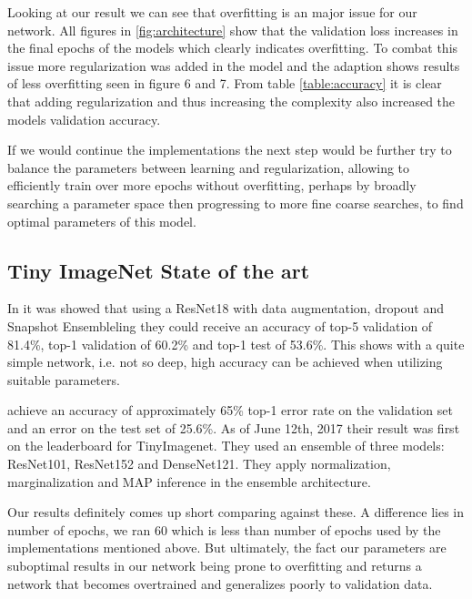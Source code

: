 \documentclass{kthreport}
\begin{document}
Looking at our result we can see that overfitting is an major issue for our network.
All figures in \ref{fig:architecture} show that the validation loss increases in the final epochs of the models which clearly indicates overfitting.
To combat this issue more regularization was added in the model and the adaption shows results of less overfitting seen in figure 6 and 7.
From table \ref{table:accuracy} it is clear that adding regularization and thus increasing the complexity also increased the models validation accuracy.

If we would continue the implementations the next step would be further try to balance the parameters between learning and regularization, allowing to efficiently train over more epochs without overfitting, perhaps by broadly searching a parameter space then progressing to more fine coarse searches, to find optimal parameters of this model.


\subsection{Tiny ImageNet State of the art}

In \cite{BarnesStanford} it was showed that using a ResNet18 with data augmentation, dropout and Snapshot Ensembleling they could receive an accuracy of top-5 validation of 81.4\%, top-1 validation of 60.2\% and top-1 test of 53.6\%. This shows with a quite simple network, i.e. not so deep, high accuracy can be achieved when utilizing suitable parameters.

\cite{vCheung} achieve an accuracy of approximately 65\% top-1 error rate on the validation set and an error on the test set of 25.6\%. As of June 12th, 2017 their result was first on the leaderboard for TinyImagenet. They used an ensemble of three models: ResNet101, ResNet152 and DenseNet121. They apply normalization, marginalization and MAP inference in the ensemble architecture.

Our results definitely comes up short comparing against these. A difference lies in number of epochs, we ran 60 which is less than number of epochs used by the implementations mentioned above. But ultimately, the fact our parameters are suboptimal results in our network being prone to overfitting and returns a network that becomes overtrained and generalizes poorly to validation data.
\end{document}
